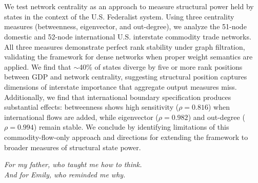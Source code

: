 \documentclass[12pt,oneside]{book}
\begin{document}
\chapter*{}
\begin{doublespace}


We test network centrality as an approach to measure structural power held by states in the context of the U.S. Federalist system. Using three centrality measures (betweenness, eigenvector, and out-degree), we analyze the 51-node domestic and 52-node international U.S. interstate commodity trade networks. All three measures demonstrate perfect rank stability under graph filtration, validating the framework for dense networks when proper weight semantics are applied. We find that $\sim$40\% of states diverge by five or more rank positions between GDP and network centrality, suggesting structural position captures dimensions of interstate importance that aggregate output measures miss. Additionally, we find that international boundary specification produces substantial effects: betweenness shows high sensitivity ($\rho = 0.816$) when international flows are added, while eigenvector ($\rho = 0.982$) and out-degree ($\rho = 0.994$) remain stable. We conclude by identifying limitations of this commodity-flow-only approach and directions for extending the framework to broader measures of structural state power.

\end{doublespace}

\newpage
\vspace*{\fill}
\begin{center}
\begin{doublespace}
\textit{For my father, who taught me how to think.\\
And for Emily, who reminded me why.}
\end{doublespace}
\end{center}
\vspace*{\fill}

\end{document}
